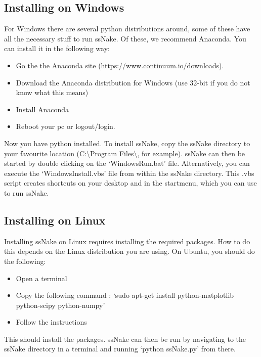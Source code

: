 \documentclass[11pt,a4paper]{article}
\begin{document}
\subsection{Installing on Windows}
For Windows there are several python distributions around, some of these have all the necessary stuff to run ssNake. Of these, we recommend Anaconda. You can install it in the following way:
\begin{itemize}
\item Go the the Anaconda site (https://www.continuum.io/downloads).
\item Download the Anaconda distribution for Windows (use 32-bit if you do not know what this means)
\item Install Anaconda
\item Reboot your pc or logout/login.
\end{itemize}
Now you have python installed. To install ssNake, copy the ssNake directory to your favourite location (C:\textbackslash{}Program Files\textbackslash{}, for example). ssNake can then be started by double clicking on the `WindowsRun.bat' file. Alternatively, you can execute the `WindowsInstall.vbs' file from within the ssNake directory. This .vbs script creates shortcuts on your desktop and in the startmenu, which you can use to run ssNake. 

\subsection{Installing on Linux}
Installing ssNake on Linux requires installing the required packages. How to do this depends on the Linux distribution you are using. On Ubuntu, you should do the following:
\begin{itemize}
\item Open a terminal
\item Copy the following command : `sudo apt-get install python-matplotlib python-scipy python-numpy'
\item Follow the instructions
\end{itemize}
This should install the packages. ssNake can then be run by navigating to the ssNake directory in a terminal and running `python ssNake.py' from there.
\end{document}
